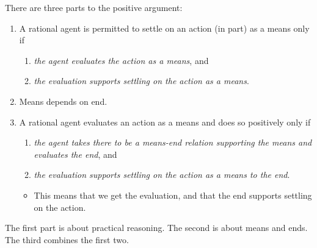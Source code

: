 \documentclass[10pt]{article}
\newcommand{\hozline}[0]{%
  \noindent\hdashrule[0.5ex][c]{\textwidth}{.1pt}{}
}
\newcommand{\hozlinedash}[0]{%
  \noindent\hdashrule[0.5ex][c]{\textwidth}{.1pt}{2.5pt}
}
\begin{document}
There are three parts to the positive argument:
\begin{enumerate}
\item A rational agent is permitted to settle on an action (in part) as a means only if
  \begin{enumerate}
  \item \emph{the agent evaluates the action as a means}, and
  \item \emph{the evaluation supports settling on the action as a means}.
  \end{enumerate}
\item Means depends on end.
\item A rational agent evaluates an action as a means and does so positively only if
  \begin{enumerate}
  \item \emph{the agent takes there to be a means-end relation supporting the means and evaluates the end}, and
  \item \emph{the evaluation supports settling on the action as a means to the end}.
  \end{enumerate}
  \begin{itemize}
  \item This means that we get the evaluation, and that the end supports settling on the action.
  \end{itemize}
\end{enumerate}

The first part is about practical reasoning.
The second is about means and ends.
The third combines the first two.


\hozlinedash





\hozline
\end{document}
